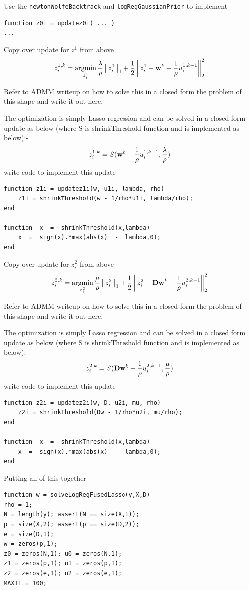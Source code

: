 \documentclass{article}
\begin{document}
{Use the \texttt{newtonWolfeBacktrack} and \texttt{logRegGaussianPrior} to implement
\begin{verbatim}
function z0i = updatez0i( ... )
...
\end{verbatim}

\newproblem{1pt} Copy over update for $z^1$ from above
\[
z_i^{1,k} = \mathop{\rm argmin}_{z_I^1}   \frac{\lambda}{\rho}\left\lVert z_{i}^{1}\right\rVert_1 + \frac{1}{2} \left\lVert z_{i}^{1} - \mathbf{w}^{k} + \frac{1}{\rho}u_{i}^{1,k-1}\right\rVert_2^{2}
\]

Refer to ADMM writeup on how to solve this in a closed form the problem of this shape and write it out here.

The optimization is simply Lasso regression and can be solved in a closed form update as below (where S is shrinkThreshold function and is implemented as below):-
\[
z_i^{1,k} = S(\mathbf{w}^{k} - \frac{1}{\rho}u_{i}^{1,k-1}, \frac{\lambda}{\rho}) 
\]
write code to implement this update
\begin{verbatim}
function z1i = updatez1i(w, u1i, lambda, rho)
    z1i = shrinkThreshold(w - 1/rho*u1i, lambda/rho);        
end

function  x  =  shrinkThreshold(x,lambda)
    x  =  sign(x).*max(abs(x)  -  lambda,0);
end
\end{verbatim}

\newproblem{1pt} Copy over update for $z_i^2$ from above
\[
z_i^{2,k} = \mathop{\rm argmin}_{z_i^2}   \frac{\mu}{\rho} \left\lVert z_{i}^{2}\right\rVert_1 + \frac{1}{2} \left\lVert z_{i}^{2} - \mathbf{D}\mathbf{w}^{k} + \frac{1}{\rho}u_{i}^{2,k-1}\right\rVert_2^{2} 
\]

Refer to ADMM writeup on how to solve this in a closed form the problem of this shape and write it out here.

The optimization is simply Lasso regression and can be solved in a closed form update as below (where S is shrinkThreshold function and is implemented as below):-
\[
z_i^{2,k} = S(\mathbf{D}\mathbf{w}^{k} - \frac{1}{\rho}u_{i}^{2, k-1}, \frac{\mu}{\rho}) 
\]
write code to implement this update
\begin{verbatim}
function z2i = updatez2i(w, D, u2i, mu, rho)    
    z2i = shrinkThreshold(Dw - 1/rho*u2i, mu/rho);
end

function  x  =  shrinkThreshold(x,lambda)
    x  =  sign(x).*max(abs(x)  -  lambda,0);
end
\end{verbatim}

\newproblem{2pt} Putting all of this together
\begin{verbatim}
function w = solveLogRegFusedLasso(y,X,D)
rho = 1;
N = length(y); assert(N == size(X,1));
p = size(X,2); assert(p == size(D,2));
e = size(D,1);
w = zeros(p,1);
z0 = zeros(N,1); u0 = zeros(N,1);
z1 = zeros(p,1); u1 = zeros(p,1);
z2 = zeros(e,1); u2 = zeros(e,1);
MAXIT = 100;


\end{verbatim}}
\end{document}
